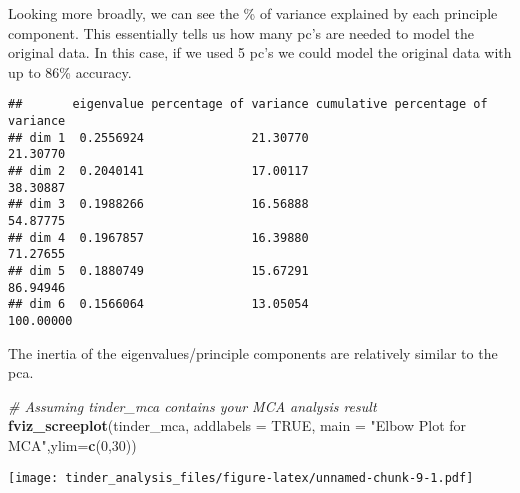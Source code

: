 \documentclass[
]{article}
\newenvironment{Shaded}{\begin{snugshade}}{\end{snugshade}}
\newcommand{\AttributeTok}[1]{\textcolor[rgb]{0.13,0.29,0.53}{#1}}
\newcommand{\CommentTok}[1]{\textcolor[rgb]{0.56,0.35,0.01}{\textit{#1}}}
\newcommand{\ConstantTok}[1]{\textcolor[rgb]{0.56,0.35,0.01}{#1}}
\newcommand{\DecValTok}[1]{\textcolor[rgb]{0.00,0.00,0.81}{#1}}
\newcommand{\FunctionTok}[1]{\textcolor[rgb]{0.13,0.29,0.53}{\textbf{#1}}}
\newcommand{\NormalTok}[1]{#1}
\newcommand{\OtherTok}[1]{\textcolor[rgb]{0.56,0.35,0.01}{#1}}
\newcommand{\SpecialCharTok}[1]{\textcolor[rgb]{0.81,0.36,0.00}{\textbf{#1}}}
\newcommand{\StringTok}[1]{\textcolor[rgb]{0.31,0.60,0.02}{#1}}
\begin{document}
Looking more broadly, we can see the \% of variance explained by each
principle component. This essentially tells us how many pc's are needed
to model the original data. In this case, if we used 5 pc's we could
model the original data with up to 86\% accuracy.

\begin{Shaded}
\end{Shaded}

\begin{verbatim}
##       eigenvalue percentage of variance cumulative percentage of variance
## dim 1  0.2556924               21.30770                          21.30770
## dim 2  0.2040141               17.00117                          38.30887
## dim 3  0.1988266               16.56888                          54.87775
## dim 4  0.1967857               16.39880                          71.27655
## dim 5  0.1880749               15.67291                          86.94946
## dim 6  0.1566064               13.05054                         100.00000
\end{verbatim}

The inertia of the eigenvalues/principle components are relatively
similar to the pca.

\begin{Shaded}
\begin{Highlighting}[]
\CommentTok{\# Assuming \textquotesingle{}tinder\_mca\textquotesingle{} contains your MCA analysis result}
\FunctionTok{fviz\_screeplot}\NormalTok{(tinder\_mca, }\AttributeTok{addlabels =} \ConstantTok{TRUE}\NormalTok{, }\AttributeTok{main =} \StringTok{"Elbow Plot for MCA"}\NormalTok{,}\AttributeTok{ylim=}\FunctionTok{c}\NormalTok{(}\DecValTok{0}\NormalTok{,}\DecValTok{30}\NormalTok{))}
\end{Highlighting}
\end{Shaded}

\texttt{[image: tinder\_analysis\_files/figure-latex/unnamed-chunk-9-1.pdf]}

\begin{Shaded}
\end{Shaded}
\end{document}
